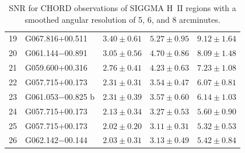 \begin{table}[H]
\begin{tabular}{l l c c c}
        19 & G067.816$+$00.511 & $3.40 \pm 0.61$ & $5.27 \pm 0.95$ & $9.12 \pm 1.64$ \\
        20 & G061.144$-$00.891 & $3.05 \pm 0.56$ & $4.70 \pm 0.86$ & $8.09 \pm 1.48$ \\
        21 & G059.600$+$00.316 & $2.76 \pm 0.41$ & $4.23 \pm 0.63$ & $7.23 \pm 1.08$ \\
        22 & G057.715$+$00.173 & $2.31 \pm 0.31$ & $3.54 \pm 0.47$ & $6.07 \pm 0.81$ \\
        23 & G061.053$-$00.825 b & $2.31 \pm 0.39$ & $3.57 \pm 0.60$ & $6.14 \pm 1.03$ \\
        24 & G057.715$+$00.173 & $2.13 \pm 0.34$ & $3.27 \pm 0.53$ & $5.60 \pm 0.90$ \\
        25 & G057.715$+$00.173 & $2.02 \pm 0.20$ & $3.11 \pm 0.31$ & $5.32 \pm 0.53$ \\
        26 & G062.142$-$00.144 & $2.03 \pm 0.31$ & $3.13 \pm 0.49$ & $5.42 \pm 0.84$ \\
        \bottomrule
    \end{tabular}
    \caption{SNR for CHORD observations of SIGGMA H~II regions with a smoothed angular resolution of 5, 6, and 8 arcminutes.}
    \label{tab:siggma_stacked_snr_smoothed}
\end{table}
